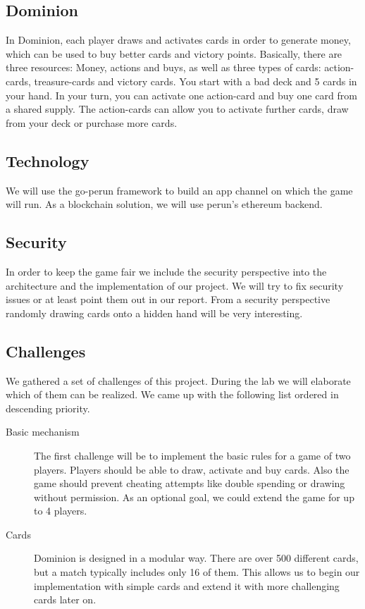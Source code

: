 \documentclass[
	paper=a0,
	ngerman,
	accentcolor=1d,
	logo=body,%
	footer=true,
	]{tudaposter}
\begin{document}
\begin{multicols}{2}
\subsection*{Dominion}
In Dominion, each player draws and activates cards in order to generate money, which can be used to buy better cards and victory points. Basically, there are three resources: Money, actions and buys, as well as three types of cards: action-cards, treasure-cards and victory cards. You start with a bad deck and 5 cards in your hand. In your turn, you can activate one action-card and buy one card from a shared supply. The action-cards can allow you to activate further cards, draw from your deck or purchase more cards.


\subsection*{Technology}
We will use the go-perun framework to build an app channel on which the game will run. As a blockchain solution, we will use perun's ethereum backend.


\subsection*{Security}
In order to keep the game fair we include the security perspective into the architecture and the implementation of our project. We will try to fix security issues or at least point them out in our report. From a security perspective randomly drawing cards onto a hidden hand will be very interesting.
\columnbreak

\subsection*{Challenges}
We gathered a set of challenges of this project. During the lab we will elaborate which of them can be realized. We came up with the following list ordered in descending priority.

\begin{description}
\item[Basic mechanism]
The first challenge will be to implement the basic rules for a game of two players. Players should be able to draw, activate and buy cards. Also the game should prevent cheating attempts like double spending or drawing without permission. As an optional goal, we could extend the game for up to 4 players.

\item[Cards]
Dominion is designed in a modular way. There are over 500 different cards, but a match typically includes only 16 of them. This allows us to begin our implementation with simple cards and extend it with more challenging cards later on.


\end{description}
\end{multicols}
\end{document}
